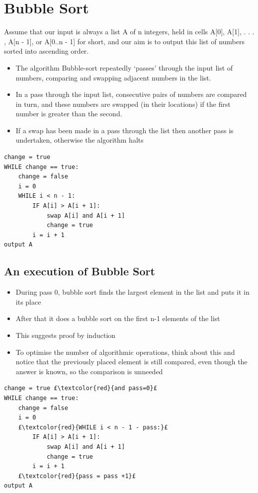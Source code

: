 \documentclass{article}[18pt]
\begin{document}
\section{Bubble Sort}
Assume that our input is always a list A of n integers, held in cells A[0], A[1], . . . , A[n - 1], or A[0..n - 1] for short, and our aim is to output this list of numbers sorted into ascending order.
\begin{itemize}
	\item The algorithm Bubble-sort repeatedly ‘passes’ through the input list of
	numbers, comparing and swapping adjacent numbers in the list.
	\item In a pass through the input list, consecutive pairs of numbers are compared
	in turn, and these numbers are swapped (in their locations) if
	the first number is greater than the second.
	\item If a swap has been made in a pass through the list then another pass
	is undertaken, otherwise the algorithm halts
\end{itemize}
\begin{lstlisting}[tabsize=4]
change = true
WHILE change == true:
	change = false
	i = 0
	WHILE i < n - 1:
		IF A[i] > A[i + 1]:
			swap A[i] and A[i + 1]
			change = true
		i = i + 1
output A
\end{lstlisting}
\subsection{An execution of Bubble Sort}
\begin{itemize}
	\item During pass 0, bubble sort finds the largest element in the list and puts it in its place
	\item After that it does a bubble sort on the first n-1 elements of the list
	\item This suggests proof by induction
	\item To optimise the number of algorithmic operations, think about this and notice that the previously placed element is still compared, even though the answer is known, so the comparison is unneeded
\end{itemize}
\begin{lstlisting}[tabsize=4,escapechar={£}]
change = true £\textcolor{red}{and pass=0}£
WHILE change == true:
	change = false
	i = 0
	£\textcolor{red}{WHILE i < n - 1 - pass:}£
		IF A[i] > A[i + 1]:
			swap A[i] and A[i + 1]
			change = true
		i = i + 1
	£\textcolor{red}{pass = pass +1}£
output A
\end{lstlisting}
\end{document}
